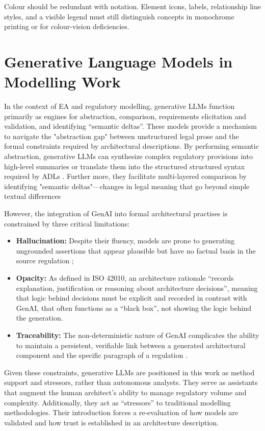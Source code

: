 Colour should be redundant with notation. Element icons, labels, relationship line styles, and a visible legend must still distinguish concepts in monochrome printing or for colour-vision deficiencies.

\section{Generative Language Models in Modelling Work}

In the context of \ac{EA} and regulatory modelling, generative \ac{LLM}s function primarily as engines for abstraction, comparison, requirements elicitation and validation, and identifying ``semantic deltas''\cite{Abualhaija2024, Zadenoori2025}.
These models provide a mechanism to navigate the "abstraction gap" between unstructured legal prose and the formal constraints required by architectural descriptions. By performing semantic abstraction, generative \ac{LLM}s can synthesize complex regulatory provisions into high-level summaries or translate them into the structured structured syntax required by \ac{ADL}s \cite{Haerer2023}. Further more, they facilitate multi-layered comparison by identifying "semantic deltas"—changes in legal meaning that go beyond simple textual differences \cite{Abualhaija2024}

However, the integration of \ac{GenAI} into formal architectural practises is constrained by three critical limitations:

\begin{itemize}
    \item \textbf{Hallucination:} Despite their fluency, models are prone to generating ungrounded assertions that appear plausible but have no factual basis in the source regulation \cite{Jeong2023};
    \item \textbf{Opacity:} As defined in ISO 42010, an architecture rationale ``records explanation, justification or reasoning about architecture decisions'', meaning that logic behind decisions must be explicit and recorded in contrast with \ac{GenAI}, that often functions as a ``black box'', not showing the logic behind the generation.
    \item \textbf{Traceability:} The non-deterministic nature of \ac{GenAI} complicates the ability to maintain a persistent, verifiable link between a generated architectural component and the specific paragraph of a regulation \cite{Zadenoori2025}. 
\end{itemize}

Given these constraints, generative \ac{LLM}s are positioned in this work as method support and stressors, rather than autonomous analysts. They serve as assistants that augment the human architect’s ability to manage regulatory volume and complexity. Additionally, they act as ``stressors'' to traditional modelling methodologies. Their introduction forces a re-evaluation of how models are validated and how trust is established in an architecture description.
